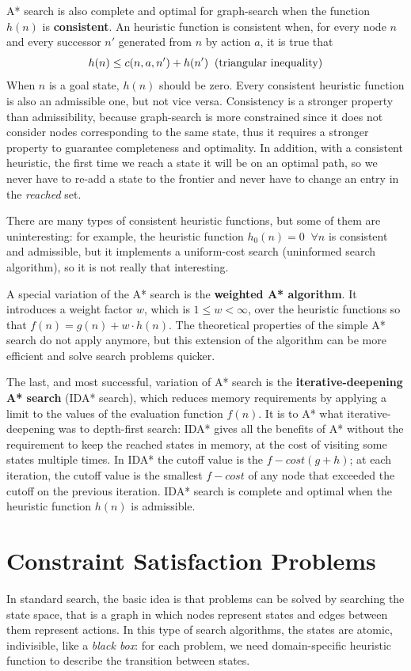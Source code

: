 \documentclass{article}
\begin{document}
A* search is also complete and optimal for graph-search when the function $h(n)$ is \textbf{consistent}. An heuristic function is consistent when, for every node $n$ and every successor $n'$ generated from $n$ by action $a$, it is true that 
$$h(n)\le c(n,a,n') + h(n') \;\; \textnormal{(triangular inequality)}$$
When $n$ is a goal state, $h(n)$ should be zero. Every consistent heuristic function is also an admissible one, but not vice versa. Consistency is a stronger property than admissibility, because graph-search is more constrained since it does not consider nodes corresponding to the same state, thus it requires a stronger property to guarantee completeness and optimality. In addition, with a consistent heuristic, the first time we reach a state it will be on an optimal path, so we never have to re-add a state to the frontier and never have to change an entry in the \textit{reached} set.

There are many types of consistent heuristic functions, but some of them are uninteresting: for example, the heuristic function $h_0(n) = 0 \;\; \forall n$ is consistent and admissible, but it implements a uniform-cost search (uninformed search algorithm), so it is not really that interesting.

A special variation of the A* search is the \textbf{weighted A* algorithm}. It introduces a weight factor $w$, which is $1 \le w < \infty$, over the heuristic functions so that $f(n) = g(n) + w \cdot h(n)$. The theoretical properties of the simple A* search do not apply anymore, but this extension of the algorithm can be more efficient and solve search problems quicker.

The last, and most successful, variation of A* search is the \textbf{iterative-deepening A* search} (IDA* search), which reduces memory requirements by applying a limit to the values of the evaluation function $f(n)$. It is to A* what iterative-deepening was to depth-first search: IDA* gives all the benefits of A* without the requirement to keep the reached states in memory, at the cost of visiting some states multiple times. In IDA* the cutoff value is the $f-cost (g+h)$; at each iteration, the cutoff value is the smallest $f-cost$ of any node that exceeded the cutoff on the previous iteration. IDA* search is complete and optimal when the heuristic function $h(n)$ is admissible.

\clearpage
\section{Constraint Satisfaction Problems}
In standard search, the basic idea is that problems can be solved by searching the state space, that is a graph in which nodes represent states and edges between them represent actions. In this type of search algorithms, the states are atomic, indivisible, like a \textit{black box}: for each problem, we need domain-specific heuristic function to describe the transition between states.
\end{document}
